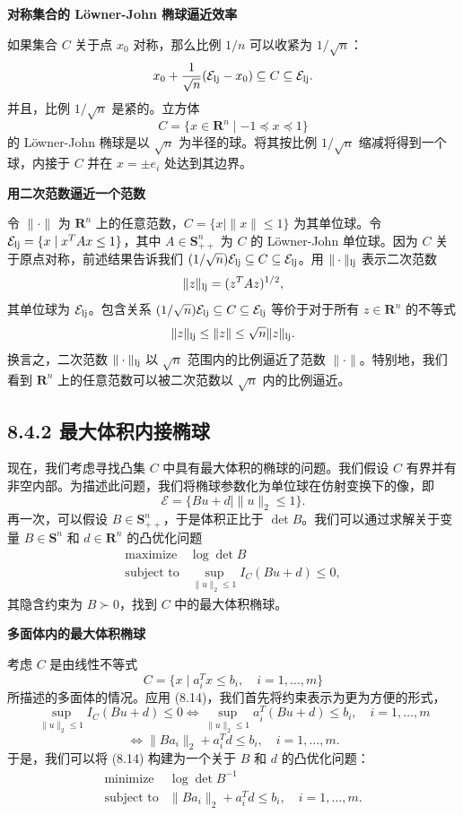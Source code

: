 \documentclass[UTF8,12pt,a4paper,fontset=fandol]{ctexart}
\begin{document}
\noindent\textbf{对称集合的 Löwner-John 椭球逼近效率}

如果集合 $C$ 关于点 $x_0$ 对称，那么比例 $1/n$ 可以收紧为 $1/\sqrt{n}$：
\[
x_0+\frac{1}{\sqrt{n}}(\mathcal{E}_{\rm lj}-x_0)\subseteq C\subseteq \mathcal{E}_{\rm lj}.
\]
并且，比例 $1/\sqrt{n}$ 是紧的。立方体
\[
C=\{x\in\mathbf{R}^n\mid -1\preceq x\preceq 1\}
\]
的 Löwner-John 椭球是以 $\sqrt{n}$ 为半径的球。将其按比例 $1/\sqrt{n}$ 缩减将得到一个球，内接于 $C$ 并在 $x=\pm e_i$ 处达到其边界。

\noindent\textbf{用二次范数逼近一个范数}

令 $\|\cdot\|$ 为 $\mathbf{R}^n$ 上的任意范数，$C=\{x\mid \|x\|\leq 1\}$ 为其单位球。令 $\mathcal{E}_{\rm lj}=\{x\mid x^TAx\leq 1\}$，其中 $A\in\mathbf{S}_{++}^n$ 为 $C$ 的 Löwner-John 单位球。因为 $C$ 关于原点对称，前述结果告诉我们 $(1/\sqrt{n})\mathcal{E}_{\rm lj}\subseteq C\subseteq \mathcal{E}_{\rm lj}$。用 $\|\cdot\|_{\rm lj}$ 表示二次范数
\[
\|z\|_{\rm lj}=(z^TAz)^{1/2},
\]
其单位球为 $\mathcal{E}_{\rm lj}$。包含关系 $(1/\sqrt{n})\mathcal{E}_{\rm lj}\subseteq C\subseteq \mathcal{E}_{\rm lj}$ 等价于对于所有 $z\in\mathbf{R}^n$ 的不等式
\[
\|z\|_{\rm lj}\leq \|z\|\leq \sqrt{n}\|z\|_{\rm lj}.
\]
换言之，二次范数 $\|\cdot\|_{\rm lj}$ 以 $\sqrt{n}$ 范围内的比例逼近了范数 $\|\cdot\|$。特别地，我们看到 $\mathbf{R}^n$ 上的任意范数可以被二次范数以 $\sqrt{n}$ 内的比例逼近。

\subsection*{8.4.2 最大体积内接椭球}

现在，我们考虑寻找凸集 $C$ 中具有最大体积的椭球的问题。我们假设 $C$ 有界并有非空内部。为描述此问题，我们将椭球参数化为单位球在仿射变换下的像，即
\[
\mathcal{E}=\{Bu+d\mid \|u\|_2\leq 1\}.
\]
再一次，可以假设 $B\in\mathbf{S}_{++}^n$，于是体积正比于 $\det B$。我们可以通过求解关于变量 $B\in\mathbf{S}^n$ 和 $d\in\mathbf{R}^n$ 的凸优化问题
\[
\begin{array}{ll}
\mbox{maximize} & \log\det B\\
\mbox{subject to} & \sup_{\|u\|_2\leq 1} I_C(Bu+d)\leq 0,
\end{array}
\tag{8.14}
\]
其隐含约束为 $B\succ 0$，找到 $C$ 中的最大体积椭球。

\noindent\textbf{多面体内的最大体积椭球}

考虑 $C$ 是由线性不等式
\[
C=\{x\mid a_i^Tx\leq b_i,\quad i=1,\ldots,m\}
\]
所描述的多面体的情况。应用 (8.14)，我们首先将约束表示为更为方便的形式，
\[
\sup_{\|u\|_2\leq 1} I_C(Bu+d)\leq 0
\Longleftrightarrow
\sup_{\|u\|_2\leq 1} a_i^T(Bu+d)\leq b_i,\quad i=1,\ldots,m
\]
\[
\Longleftrightarrow \|Ba_i\|_2+a_i^Td\leq b_i,\quad i=1,\ldots,m.
\]
于是，我们可以将 (8.14) 构建为一个关于 $B$ 和 $d$ 的凸优化问题：
\[
\begin{array}{ll}
\mbox{minimize} & \log\det B^{-1}\\
\mbox{subject to} & \|Ba_i\|_2+a_i^Td\leq b_i,\quad i=1,\ldots,m.
\end{array}
\tag{8.15}
\]
\end{document}
